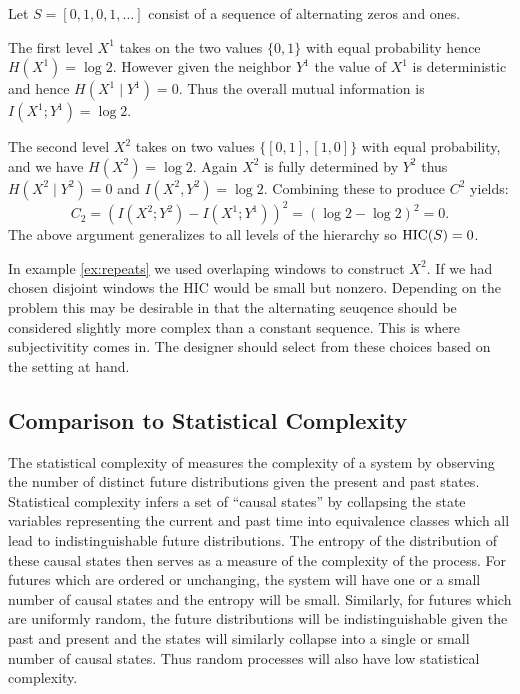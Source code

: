 \begin{example}
  \label{ex:repeats}
  Let $S = [0, 1, 0, 1, \ldots]$ consist of a sequence of alternating zeros and
  ones.

  The first level $X^1$ takes on the two values $\{0, 1\}$ with equal
  probability hence $H(X^1) = \log 2$. However given the neighbor $Y^1$ the
  value of $X^1$ is deterministic and hence $H(X^1 \mid Y^1) = 0$. Thus the
  overall mutual information is $I(X^1; Y^1) = \log 2$.

  The second level $X^2$ takes on two values $\{[0, 1], [1, 0]\}$ with
  equal probability, and we have $H(X^2) = \log 2$. Again $X^2$ is fully
  determined by $Y^2$ thus $H(X^2 \mid Y^2) = 0$ and $I(X^2, Y^2) = \log 2$.
  Combining these to produce $C^2$ yields:
  \begin{equation}
    C_2 = (I(X^2; Y^2) - I(X^1; Y^1))^2 = (\log 2 - \log 2)^2 = 0.
  \end{equation}
  The above argument generalizes to all levels of the hierarchy so $\textup{HIC}(S) = 0$.
\end{example}

In example \ref{ex:repeats} we used overlaping windows to construct $X^2$. If
we had chosen disjoint windows the HIC would be small but nonzero. Depending on
the problem this may be desirable in that the alternating seuqence should be
considered slightly more complex than a constant sequence. This is where
subjectivitity comes in. The designer should select from these choices
based on the setting at hand.

\subsection{Comparison to Statistical Complexity}
\label{statistical_complexity}

The statistical complexity of \citet{crutchfield1989inferring} measures the
complexity of a system by observing the number of distinct future distributions
given the present and past states.  Statistical complexity infers a set of
``causal states'' by collapsing the state variables representing the current
and past time into equivalence classes which all lead to indistinguishable
future distributions. The entropy of the distribution of these causal states
then serves as a measure of the complexity of the process. For futures which
are ordered or unchanging, the system will have one or a small number of causal
states and the entropy will be small. Similarly, for futures which are
uniformly random, the future distributions will be indistinguishable given the
past and present and the states will similarly collapse into a single or small
number of causal states. Thus random processes will also have low statistical
complexity.

